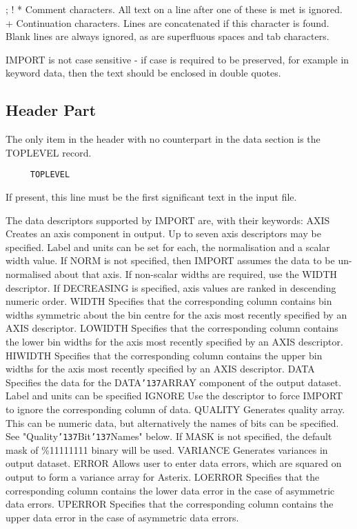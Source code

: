 \documentclass{book}
\renewcommand{\_}{{\tt\char'137}}     %
\begin{document}
; ! * Comment characters. All text on a line after one of
these is met is ignored.
~ + Continuation characters. Lines are concatenated if
this character is found.
Blank lines are always ignored, as are superfluous spaces and
tab characters.

IMPORT is not case sensitive - if case is required to be
preserved, for example in keyword data, then the text should
be enclosed in double quotes.

\subsection{Header Part}
The only item in the header with no counterpart in the
data section is the TOPLEVEL record.

\begin{verbatim}
     TOPLEVEL
 \end{verbatim}
If present, this line must be the first significant text
in the input file.

The data descriptors supported by IMPORT are, with their
keywords:
AXIS
Creates an axis component in output. Up to seven
axis descriptors may be specified. Label and units
can be set for each, the normalisation and a scalar
width value. If NORM is not specified, then IMPORT
assumes the data to be un-normalised about that axis.
If non-scalar widths are required, use the WIDTH
descriptor. If DECREASING is specified, axis values
are ranked in descending numeric order.
WIDTH Specifies that the corresponding column contains
bin widths symmetric about the bin centre for the
axis most recently specified by an AXIS descriptor.
LOWIDTH Specifies that the corresponding column contains the
lower bin widths for the axis most recently specified
by an AXIS descriptor.
HIWIDTH Specifies that the corresponding column contains the
upper bin widths for the axis most recently specified
by an AXIS descriptor.
DATA
Specifies the data for the DATA\_ARRAY component of
the output dataset. Label and units can be specified
IGNORE Use the descriptor to force IMPORT to ignore the
corresponding column of data.
QUALITY
Generates quality array. This can be numeric data,
but alternatively the names of bits can be specified.
See "Quality\_Bit\_Names" below. If MASK is not
specified, the default mask of \%11111111 binary will
be used.
VARIANCE Generates variances in output dataset.
ERROR Allows user to enter data errors, which are squared
on output to form a variance array for Asterix.
LOERROR Specifies that the corresponding column contains the
lower data error in the case of asymmetric data errors.
UPERROR Specifies that the corresponding column contains the
upper data error in the case of asymmetric data errors.
\end{document}
